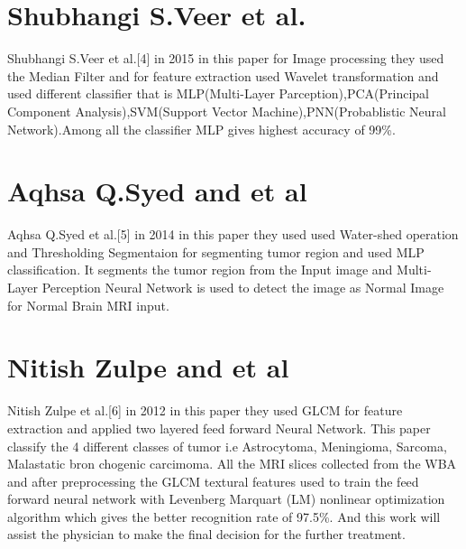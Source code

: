   \section{ Shubhangi S.Veer et al. \cite{ref4}}
  
   Shubhangi S.Veer et al.[4] in 2015 in this paper for Image processing they used the Median Filter and for feature extraction used Wavelet transformation and used different classifier that is MLP(Multi-Layer Parception),PCA(Principal Component Analysis),SVM(Support Vector Machine),PNN(Probablistic Neural Network).Among all the classifier MLP gives highest accuracy of 99\%.
   
   \section{Aqhsa Q.Syed and et al \cite{ref5}}
   
   Aqhsa Q.Syed et al.[5] in 2014 in this paper they used  used   Water-shed operation and Thresholding Segmentaion for segmenting tumor region and used MLP classification. It segments the tumor region  from the    Input    image and Multi-Layer Perception   Neural Network  is  used  to detect the image as Normal  Image for Normal  Brain  MRI input.

 
   \section{Nitish Zulpe and et al \cite{ref6}}
   
   Nitish Zulpe et al.[6] in 2012 in this paper they used GLCM for feature extraction and applied two layered feed forward Neural Network. This paper classify the 4 different classes of tumor i.e Astrocytoma, Meningioma, Sarcoma, Malastatic bron chogenic carcimoma. All the MRI slices collected from the WBA and after preprocessing the GLCM textural features used to train the feed forward neural network with Levenberg Marquart (LM) nonlinear optimization algorithm which gives the better recognition rate of 97.5\%. And this work will assist the physician to make the final decision for the further treatment.
  

